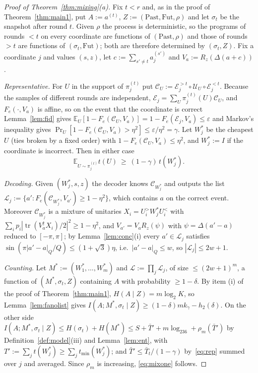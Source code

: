 \documentclass[aps,prx,twocolumn,superscriptaddress,nofootinbib,longbibliography]{revtex4-2}
\theoremstyle{plain}
\theoremstyle{definition}
\theoremstyle{remark}
\newcommand{\E}{\mathbb{E}}
\newcommand{\tr}{\operatorname{tr}}
\begin{document}
\begin{proof}[Proof of Theorem~\ref{thm:mixing}(a)]
Fix $t<r$ and, as in the proof of Theorem~\ref{thm:main1}, put $A:=a^{(t)}$, $Z:=(\mathrm{Past},\mathrm{Fut},\rho)$ and let $\sigma_t$ be the snapshot after round $t$. Given $\rho$ the process is deterministic, so the programs of rounds $<t$ on every coordinate are functions of $(\mathrm{Past},\rho)$ and those of rounds $>t$ are functions of $(\sigma_t,\mathrm{Fut})$; both are therefore determined by $(\sigma_t,Z)$. Fix a coordinate $j$ and values $(s,z)$, let $c:=\sum_{s'\ne t}a^{(s')}_j$ and $V_a:=R_z(\Delta(a+c))$.

\emph{Representative.} For $U$ in the support of $\pi^{(t)}_j$ put $\mathcal C_U:=\mathcal E^{>t}_j\circ\mathcal U_U\circ\mathcal E^{<t}_j$. Because the samples of different rounds are independent, $\mathcal E_j=\sum_U\pi^{(t)}_j(U)\mathcal C_U$, and $F_e(\cdot,V_a)$ is affine, so on the event that the coordinate is correct Lemma~\ref{lem:fid} gives $\E_U[1-F_e(\mathcal C_U,V_a)]=1-F_e(\mathcal E_j,V_a)\le\varepsilon$ and Markov's inequality gives $\Pr_U[1-F_e(\mathcal C_U,V_a)>\eta^2]\le\varepsilon/\eta^2=\gamma$. Let $W^*_j$ be the cheapest $U$ (ties broken by a fixed order) with $1-F_e(\mathcal C_U,V_a)\le\eta^2$, and $W^*_j:=I$ if the coordinate is incorrect. Then in either case
\begin{equation}\label{eq:rep}
\E_{U\sim\pi^{(t)}_j}t(U)\ \ge\ (1-\gamma)\,t(W^*_j).
\end{equation}

\emph{Decoding.} Given $(W^*_j,s,z)$ the decoder knows $\mathcal C_{W^*_j}$ and outputs the list $\mathcal L_j:=\{a':F_e(\mathcal C_{W^*_j},V_{a'})\ge1-\eta^2\}$, which contains $a$ on the correct event. Moreover $\mathcal C_{W^*_j}$ is a mixture of unitaries $X_i=U^>_iW^*_jU^<_i$ with $\sum_ip_i|\tr(V_a^\dagger X_i)/2|^2\ge1-\eta^2$, and $V_{a'}=V_aR_z(\psi)$ with $\psi=\Delta(a'-a)$ reduced to $[-\pi,\pi]$; by Lemma~\ref{lem:conc}(i) every $a'\in\mathcal L_j$ satisfies $\sin(\pi|a'-a|_Q/Q)\le(1+\sqrt3)\eta$, i.e.\ $|a'-a|_Q\le w$, so $|\mathcal L_j|\le2w+1$.

\emph{Counting.} Let $M^*:=(W^*_1,\dots,W^*_m)$ and $\mathcal L:=\prod_j\mathcal L_j$, of size $\le(2w+1)^m$, a function of $(M^*,\sigma_t,Z)$ containing $A$ with probability $\ge1-\delta$. By item (i) of the proof of Theorem~\ref{thm:main1}, $H(A\mid Z)=m\log_2K$, so Lemma~\ref{lem:fanolist} gives $I(A;M^*,\sigma_t\mid Z)\ge(1-\delta)mk_\gamma-h_2(\delta)$. On the other side $I(A;M^*,\sigma_t\mid Z)\le H(\sigma_t)+H(M^*)\le S+\bar T'+m\log_236+\rho_m(\bar T')$ by Definition~\ref{def:model}(iii) and Lemma~\ref{lem:ent}, with $T':=\sum_jt(W^*_j)\ge\sum_jt_{\min}(W^*_j)$; and $\bar T'\le\bar T_t/(1-\gamma)$ by~\eqref{eq:rep} summed over $j$ and averaged. Since $\rho_m$ is increasing, \eqref{eq:mixone} follows.
\end{proof}
\end{document}
